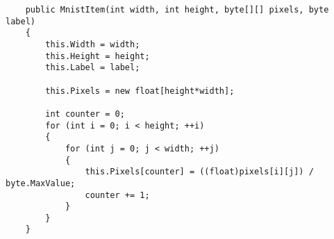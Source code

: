 \begin{verbatim}
    public MnistItem(int width, int height, byte[][] pixels, byte label)
    {
        this.Width = width;
        this.Height = height;
        this.Label = label;

        this.Pixels = new float[height*width];

        int counter = 0;
        for (int i = 0; i < height; ++i)
        {
            for (int j = 0; j < width; ++j)
            {
                this.Pixels[counter] = ((float)pixels[i][j]) / byte.MaxValue;
                counter += 1;
            }
        }
    }
\end{verbatim}